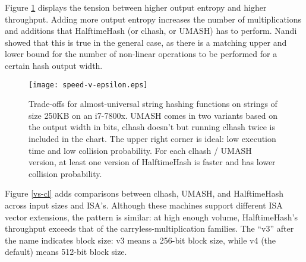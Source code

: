 \documentclass[runningheads]{llncs}
\begin{document}
Figure \ref{frontier} displays the tension between higher output entropy and higher throughput.
Adding more output entropy increases the number of multiplications and additions that HalftimeHash (or clhash, or UMASH) has to perform.
Nandi showed that this is true in the general case, as there is a matching upper and lower bound for the number of non-linear operations to be performed for a certain hash output width. \cite{ehc-nandi}




\begin{figure}
\texttt{[image: speed-v-epsilon.eps]}
\caption{
  \label{frontier}
  Trade-offs for almost-universal string hashing functions on strings of size 250KB on an i7-7800x.
  UMASH comes in two variants based on the output width in bits, clhash doesn't but running clhash twice is included in the chart.
  The upper right corner is ideal: low execution time and low collision probability.
  For each clhash / UMASH version, at least one version of HalftimeHash is faster and has lower collision probability. \protect\cite{layer-of-maxima}
}
\end{figure}

Figure \ref{vs-cl} adds comparisons between clhash, UMASH, and HalftimeHash across input sizes and ISA's.
Although these machines support different ISA vector extensions, the pattern is similar: at high enough volume, HalftimeHash's throughput exceeds that of the carryless-multiplication families.
The ``v3'' after the name indicates block size: v3 means a 256-bit block size, while v4 (the default) means 512-bit block size.

\end{document}
